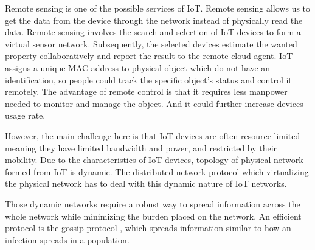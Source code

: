 \documentclass[12pt,journal]{IEEEtran}
\begin{document}
Remote sensing is one of the possible services of IoT. Remote sensing allows us to get the data from the device through the network instead of physically read the data. Remote sensing involves the search and selection of IoT devices to form a virtual sensor network. Subsequently, the selected devices estimate the wanted property collaboratively and report the result to the remote cloud agent. IoT assigns a unique MAC address to physical object which do not have an identification, so people could track the specific object’s status and control it remotely. The advantage of remote control is that it requires less manpower needed to monitor and manage the object. And it could further increase devices usage rate.

However, the main challenge here is that IoT devices are often resource limited meaning they have limited bandwidth and power, and restricted by their mobility. Due to the characteristics of IoT devices, topology of physical network formed from IoT is dynamic. The distributed network protocol which virtualizing the physical network has to deal with this dynamic nature of IoT networks.


Those dynamic networks require a robust way to spread information across the whole network while minimizing the burden placed on the network. An efficient protocol is the gossip protocol \cite{gossip}, which spreads information similar to how an infection spreads in a population.




\end{document}
